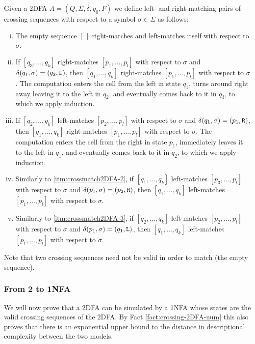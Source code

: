 \begin{defn}
	Given a 2DFA $A=(Q,\Sigma,\delta,q_0,F)$ we define left- and right-matching pairs of crossing sequences with respect to a symbol $\sigma\in\Sigma$ as follows:
	\begin{enumerate}[i.]
		\item The empty sequence $[~]$ right-matches and left-matches itself with respect to $\sigma$.
		\item \label{itm:crossmatch2DFA-2} If $[q_3,\dots,q_k]$ right-matches $[p_1,\dots,p_l]$ with respect to $\sigma$ and $\delta(q_1,\sigma)=(q_2,\mathtt L)$, then $[q_1,\dots,q_k]$ right-matches $[p_1,\dots,p_l]$ with respect to $\sigma$.
		      The computation enters the cell from the left in state $q_1$, turns around right away leaving it to the left in $q_2$, and eventually comes back to it in $q_3$, to which we apply induction.
		\item \label{itm:crossmatch2DFA-3} If $[q_2,\dots,q_k]$ left-matches $[p_2,\dots,p_l]$ with respect to $\sigma$ and $\delta(q_1,\sigma)=(p_1,\mathtt R)$, then $[q_1,\dots,q_k]$ right-matches $[p_1,\dots,p_l]$ with respect to $\sigma$.
		      The computation enters the cell from the right in state $p_1$, immediately leaves it to the left in $q_1$, and eventually comes back to it in $q_2$, to which we apply induction.
		\item \label{itm:crossmatch2DFA-4} Similarly to \ref{itm:crossmatch2DFA-2}, if $[q_1,\dots,q_k]$ left-matches $[p_3,\dots,p_l]$ with respect to $\sigma$ and $\delta(p_1,\sigma)=(p_2,\mathtt R)$, then $[q_1,\dots,q_k]$ left-matches $[p_1,\dots,p_l]$ with respect to $\sigma$.
		\item \label{itm:crossmatch2DFA-5} Similarly to \ref{itm:crossmatch2DFA-3}, if $[q_2,\dots,q_k]$ left-matches $[p_2,\dots,p_l]$ with respect to $\sigma$ and $\delta(p_1,\sigma)=(q_1,\mathtt L)$, then $[q_1,\dots,q_k]$ left-matches $[p_1,\dots,p_l]$ with respect to $\sigma$.
	\end{enumerate}
\end{defn}
Note that two crossing sequences need not be valid in order to match (\eg the empty sequence).

\subsubsection{From 2\DFAs{} to 1NFA}
We will now prove that a 2DFA can be simulated by a 1NFA whose states are the valid crossing sequences of the 2DFA.
By Fact \ref{fact:crossing-2DFA-num} this also proves that there is an exponential upper bound to the distance in descriptional complexity between the two models.

